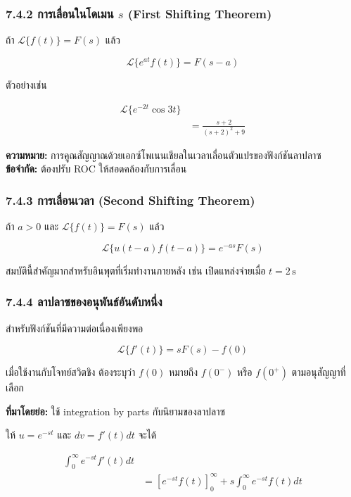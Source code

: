 \subsubsection{\texorpdfstring{7.4.2 การเลื่อนในโดเมน $s$ (First Shifting Theorem)}{7.4.2 การเลื่อนในโดเมน s (First Shifting Theorem)}}

ถ้า $\mathcal{L}\{f(t)\}=F(s)$ แล้ว

\[
\boxed{\mathcal{L}\{e^{at}f(t)\}=F(s-a)}
\]

ตัวอย่างเช่น

\[
\begin{aligned}
    \mathcal{L}\{e^{-2t}\cos 3t\}&\\
    &=\frac{s+2}{(s+2)^2+9}
\end{aligned}
\]

\textbf{ความหมาย:} การคูณสัญญาณด้วยเอกซ์โพเนนเชียลในเวลาเลื่อนตัวแปรของฟังก์ชันลาปลาซ\\
\textbf{ข้อจำกัด:} ต้องปรับ ROC ให้สอดคล้องกับการเลื่อน

\subsubsection{7.4.3 การเลื่อนเวลา (Second Shifting Theorem)}

ถ้า $a>0$ และ $\mathcal{L}\{f(t)\}=F(s)$ แล้ว

\[
\boxed{\mathcal{L}\{u(t-a)f(t-a)\}=e^{-as}F(s)}
\]

สมบัตินี้สำคัญมากสำหรับอินพุตที่เริ่มทำงานภายหลัง เช่น เปิดแหล่งจ่ายเมื่อ $t=2\,\mathrm{s}$

\subsubsection{7.4.4 ลาปลาซของอนุพันธ์อันดับหนึ่ง}

สำหรับฟังก์ชันที่มีความต่อเนื่องเพียงพอ

\[
\boxed{\mathcal{L}\{f'(t)\}=sF(s)-f(0)}
\]

เมื่อใช้งานกับโจทย์สวิตชิง ต้องระบุว่า $f(0)$ หมายถึง $f(0^-)$ หรือ $f(0^+)$ ตามอนุสัญญาที่เลือก

\textbf{ที่มาโดยย่อ:} ใช้ integration by parts กับนิยามของลาปลาซ

ให้ $u=e^{-st}$ และ $dv=f'(t)dt$ จะได้

\[
\begin{aligned}
    \int_0^\infty e^{-st}f'(t)dt&\\
    &=\left[e^{-st}f(t)\right]_0^\infty+s\int_0^\infty e^{-st}f(t)dt
\end{aligned}
\]

